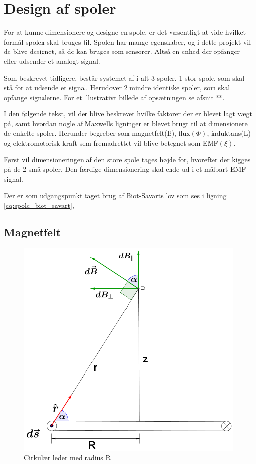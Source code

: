 \section{Design af spoler}\label{sec:sec_spole_design}
For at kunne dimensionere og designe en spole, er det væsentligt at vide hvilket formål spolen skal bruges til. Spolen har mange egenskaber, og i dette projekt vil de blive designet, så de kan bruges som sensorer. Altså en enhed der opfanger eller udsender et analogt signal. 

Som beskrevet tidligere, består systemet af i alt 3 spoler. 1 stor spole, som skal stå for at udsende et signal. Herudover 2 mindre identiske spoler, som skal opfange signalerne. For et illustrativt billede af opsætningen se afsnit **.

I den følgende tekst, vil der blive beskrevet hvilke faktorer der er blevet lagt vægt på, samt hvordan nogle af Maxwells ligninger er blevet brugt til at dimensionere de enkelte spoler. Herunder begreber som magnetfelt(B), flux$(\Phi)$, induktans(L) og elektromotorisk kraft som fremadrettet vil blive betegnet som EMF$(\xi)$. 

Først vil dimensioneringen af den store spole tages højde for, hvorefter der kigges på de 2 små spoler.
Den færdige dimensionering skal ende ud i et målbart EMF signal.

Der er som udgangspunkt taget brug af Biot-Savarts lov som ses i ligning \ref{eq:spole_biot_savart}, 
\subsection{Magnetfelt}
\begin{figure}[h!]
	\centering
	\includegraphics[width=.6\textwidth]{billeder/B_felt.png}
	\caption{Cirkulær leder med radius R}
	\label{fig:spole_fig1}
\end{figure}

